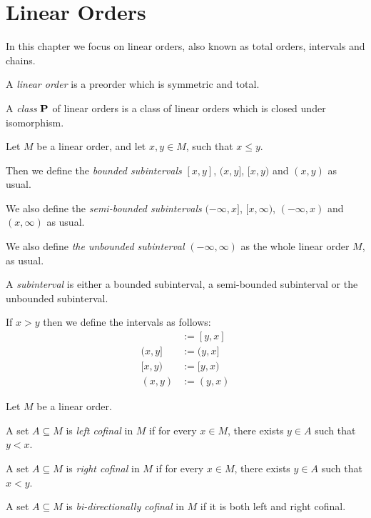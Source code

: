 \section{Linear Orders}

In this chapter we focus on linear orders, also known as
total orders, intervals and chains.

\begin{definitions}
  A \emph{linear order} is a preorder which is symmetric and total.
\end{definitions}

\begin{definition}
  A \emph{class} $\mathbf{P}$ of linear orders is a class of linear orders which
  is closed under isomorphism.
\end{definition}

\begin{definition}[Subintervals]
  Let $M$ be a linear order,
  and let $x, y \in M$, such that $x \le y$.

  Then we define the \emph{bounded subintervals} $[x, y]$,
  $(x, y]$, $[x, y)$ and $(x, y)$ as usual.

          We also define the \emph{semi-bounded subintervals} $(-\infty, x]$,
  $[x, \infty)$, $(-\infty, x)$ and $(x, \infty)$ as usual.

  We also define \emph{the unbounded subinterval} $(-\infty, \infty)$ as the whole linear order $M$,
  as usual.

  A \emph{subinterval} is either
  a bounded subinterval, a semi-bounded subinterval or the unbounded subinterval.

  If $x > y$ then we define the intervals as follows:
  \begin{align*}
    [x, y] & := [y, x] \\
    (x, y] & := (y, x] \\
    [x, y) & := [y, x) \\
    (x, y) & := (y, x)
  \end{align*}

\end{definition}

\begin{definition}
  Let $M$ be a linear order.

  A set $A \subseteq M$ is \emph{left cofinal} in $M$ if for every $x \in M$,
  there exists $y \in A$ such that $y < x$.

  A set $A \subseteq M$ is \emph{right cofinal} in $M$ if for every $x \in M$,
  there exists $y \in A$ such that $x < y$.

  A set $A \subseteq M$ is \emph{bi-directionally cofinal} in $M$ if it is both left and right cofinal.
\end{definition}


